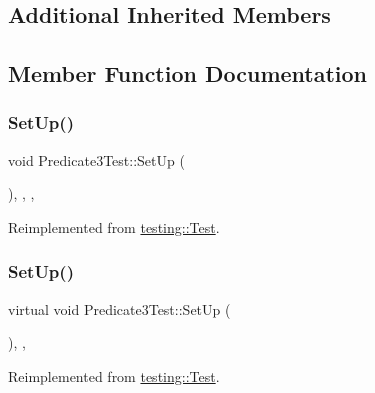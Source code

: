\subsection*{Additional Inherited Members}


\subsection{Member Function Documentation}
\mbox{\label{class_predicate3_test_a4f70b241201bac1bfee5d159702188b4}} 
\subsubsection{\texorpdfstring{SetUp()}{SetUp()}\hspace{0.1cm}{\footnotesize\ttfamily [1/3]}}
{\footnotesize\ttfamily void Predicate3\+Test\+::\+Set\+Up (\begin{DoxyParamCaption}{ }\end{DoxyParamCaption})\hspace{0.3cm}{\ttfamily [inline]}, {\ttfamily [override]}, {\ttfamily [protected]}, {\ttfamily [virtual]}}



Reimplemented from \mbox{\hyperlink{classtesting_1_1_test_a190315150c303ddf801313fd1a777733}{testing\+::\+Test}}.

\mbox{\label{class_predicate3_test_a92aad9566e0737b6739d1db14e7912be}} 
\subsubsection{\texorpdfstring{SetUp()}{SetUp()}\hspace{0.1cm}{\footnotesize\ttfamily [2/3]}}
{\footnotesize\ttfamily virtual void Predicate3\+Test\+::\+Set\+Up (\begin{DoxyParamCaption}{ }\end{DoxyParamCaption})\hspace{0.3cm}{\ttfamily [inline]}, {\ttfamily [protected]}, {\ttfamily [virtual]}}



Reimplemented from \mbox{\hyperlink{classtesting_1_1_test_a190315150c303ddf801313fd1a777733}{testing\+::\+Test}}.

